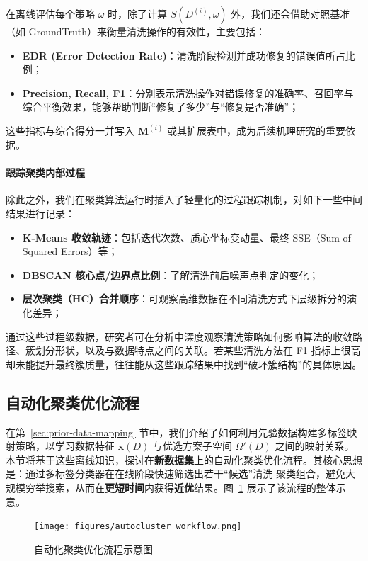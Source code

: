 \documentclass[10pt]{article} %
\numberwithin{equation}{section}
\begin{document}
在离线评估每个策略 $\omega$ 时，除了计算 $S(D^{(i)}, \omega)$ 外，我们还会借助对照基准（如 GroundTruth）来衡量清洗操作的有效性，主要包括：
\begin{itemize}
    \item \textbf{EDR (Error Detection Rate)}\cite{Ni2023}：清洗阶段检测并成功修复的错误值所占比例；
    \item \textbf{Precision, Recall, F1}：分别表示清洗操作对错误修复的准确率、召回率与综合平衡效果，能够帮助判断“修复了多少”与“修复是否准确”；
\end{itemize}
这些指标与综合得分一并写入 $\mathbf{M}^{(i)}$ 或其扩展表中，成为后续机理研究的重要依据。

\paragraph{跟踪聚类内部过程}

除此之外，我们在聚类算法运行时插入了轻量化的过程跟踪机制，对如下一些中间结果进行记录：
\begin{itemize}
    \item \textbf{K-Means 收敛轨迹}：包括迭代次数、质心坐标变动量、最终 SSE（Sum of Squared Errors）等；
    \item \textbf{DBSCAN 核心点/边界点比例}：了解清洗前后噪声点判定的变化；
    \item \textbf{层次聚类（HC）合并顺序}：可观察高维数据在不同清洗方式下层级拆分的演化差异；
\end{itemize}

通过这些过程级数据，研究者可在分析中深度观察清洗策略如何影响算法的收敛路径、簇划分形状，以及与数据特点之间的关联。若某些清洗方法在 F1 指标上很高却未能提升最终簇质量，往往能从这些跟踪结果中找到“破坏簇结构”的具体原因。

\subsection{自动化聚类优化流程}
\label{sec:autocluster-process}

在第~\ref{sec:prior-data-mapping} 节中，我们介绍了如何利用先验数据构建多标签映射策略，以学习数据特征 $\mathbf{x}(D)$ 与优选方案子空间 $\Omega'(D)$ 之间的映射关系。本节将基于这些离线知识，探讨在\textbf{新数据集}上的自动化聚类优化流程。其核心思想是：通过多标签分类器在在线阶段快速筛选出若干“候选”清洗-聚类组合，避免大规模穷举搜索，从而在\textbf{更短时间}内获得\textbf{近优}结果。图~\ref{fig:autocluster-workflow} 展示了该流程的整体示意。

\begin{figure}[htbp]
  \centering
  \texttt{[image: figures/autocluster\_workflow.png]}
  \caption{自动化聚类优化流程示意图}
  \label{fig:autocluster-workflow}
\end{figure}
\end{document}
